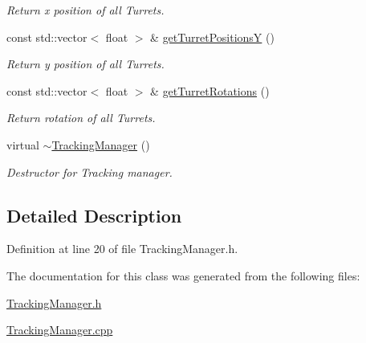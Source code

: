 \begin{DoxyCompactItemize}
\begin{DoxyCompactList}\small\item\em Return x position of all Turrets. \end{DoxyCompactList}\item 
\hypertarget{class_tracking_manager_a82406f448e4cea6dc036e57b467eafaf}{const std\+::vector$<$ float $>$ \& \hyperlink{class_tracking_manager_a82406f448e4cea6dc036e57b467eafaf}{get\+Turret\+Positions\+Y} ()}\label{class_tracking_manager_a82406f448e4cea6dc036e57b467eafaf}

\begin{DoxyCompactList}\small\item\em Return y position of all Turrets. \end{DoxyCompactList}\item 
\hypertarget{class_tracking_manager_ab073910a54a6e8badb90ae3b9e0e3cc7}{const std\+::vector$<$ float $>$ \& \hyperlink{class_tracking_manager_ab073910a54a6e8badb90ae3b9e0e3cc7}{get\+Turret\+Rotations} ()}\label{class_tracking_manager_ab073910a54a6e8badb90ae3b9e0e3cc7}

\begin{DoxyCompactList}\small\item\em Return rotation of all Turrets. \end{DoxyCompactList}\item 
\hypertarget{class_tracking_manager_aab0fa1e178458935019e6459d11ddea2}{virtual \hyperlink{class_tracking_manager_aab0fa1e178458935019e6459d11ddea2}{$\sim$\+Tracking\+Manager} ()}\label{class_tracking_manager_aab0fa1e178458935019e6459d11ddea2}

\begin{DoxyCompactList}\small\item\em Destructor for Tracking manager. \end{DoxyCompactList}\end{DoxyCompactItemize}


\subsection{Detailed Description}


Definition at line 20 of file Tracking\+Manager.\+h.



The documentation for this class was generated from the following files\+:\begin{DoxyCompactItemize}
\item 
\hyperlink{_tracking_manager_8h}{Tracking\+Manager.\+h}\item 
\hyperlink{_tracking_manager_8cpp}{Tracking\+Manager.\+cpp}\end{DoxyCompactItemize}
